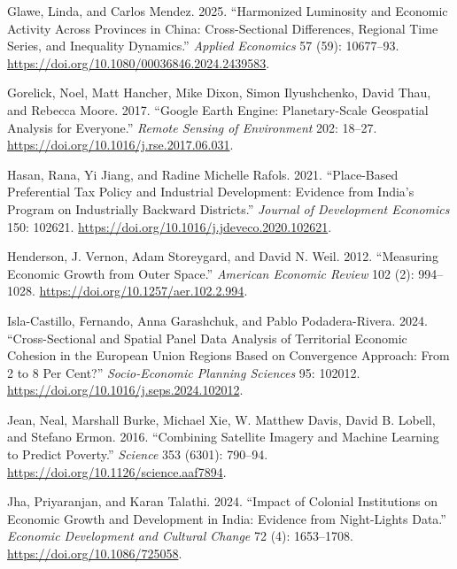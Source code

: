 \documentclass[
  letterpaper,
  DIV=11,
  numbers=noendperiod]{scrartcl}
\newlength{\cslhangindent}
\newenvironment{CSLReferences}[2] %
 {\begin{list}{}{%
  \setlength{\itemindent}{0pt}
  \setlength{\leftmargin}{0pt}
  \setlength{\parsep}{0pt}
  \ifodd #1
   \setlength{\leftmargin}{\cslhangindent}
   \setlength{\itemindent}{-1\cslhangindent}
  \fi
  \setlength{\itemsep}{#2\baselineskip}}}
 {\end{list}}
\begin{document}
\begin{CSLReferences}{1}{0}
Glawe, Linda, and Carlos Mendez. 2025. {``Harmonized Luminosity and
Economic Activity Across Provinces in {China}: {Cross}-Sectional
Differences, Regional Time Series, and Inequality Dynamics.''}
\emph{Applied Economics} 57 (59): 10677--93.
\url{https://doi.org/10.1080/00036846.2024.2439583}.

Gorelick, Noel, Matt Hancher, Mike Dixon, Simon Ilyushchenko, David
Thau, and Rebecca Moore. 2017. {``Google {E}arth {E}ngine:
Planetary-Scale Geospatial Analysis for Everyone.''} \emph{Remote
Sensing of Environment} 202: 18--27.
\url{https://doi.org/10.1016/j.rse.2017.06.031}.

Hasan, Rana, Yi Jiang, and Radine Michelle Rafols. 2021. {``Place-Based
Preferential Tax Policy and Industrial Development: Evidence from
{India}'s Program on Industrially Backward Districts.''} \emph{Journal
of Development Economics} 150: 102621.
\url{https://doi.org/10.1016/j.jdeveco.2020.102621}.

Henderson, J. Vernon, Adam Storeygard, and David N. Weil. 2012.
{``Measuring Economic Growth from Outer Space.''} \emph{American
Economic Review} 102 (2): 994--1028.
\url{https://doi.org/10.1257/aer.102.2.994}.

Isla-Castillo, Fernando, Anna Garashchuk, and Pablo Podadera-Rivera.
2024. {``Cross-Sectional and Spatial Panel Data Analysis of Territorial
Economic Cohesion in the {European Union} Regions Based on Convergence
Approach: From 2 to 8 Per Cent?''} \emph{Socio-Economic Planning
Sciences} 95: 102012. \url{https://doi.org/10.1016/j.seps.2024.102012}.

Jean, Neal, Marshall Burke, Michael Xie, W. Matthew Davis, David B.
Lobell, and Stefano Ermon. 2016. {``Combining Satellite Imagery and
Machine Learning to Predict Poverty.''} \emph{Science} 353 (6301):
790--94. \url{https://doi.org/10.1126/science.aaf7894}.

Jha, Priyaranjan, and Karan Talathi. 2024. {``Impact of Colonial
Institutions on Economic Growth and Development in {India}: Evidence
from Night-Lights Data.''} \emph{Economic Development and Cultural
Change} 72 (4): 1653--1708. \url{https://doi.org/10.1086/725058}.


\end{CSLReferences}
\end{document}
